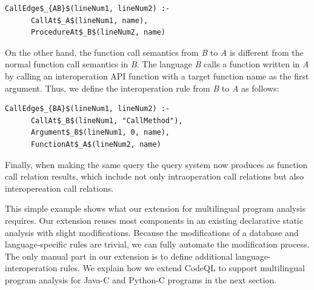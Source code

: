 
\begin{lstlisting}[style=mrule]
    CallEdge$_{AB}$(lineNum1, lineNum2) :-
      CallAt$_A$(lineNum1, name),
      ProcedureAt$_B$(lineNum2, name)
\end{lstlisting}

\noindent
On the other hand, the function call semantics from {\it B} to {\it A} is
different from the normal function call semantics in {\it B}. The language {\it B} calls
a function written in {\it A} by calling an interoperation API function  with a target function name as the first argument. Thus, we define
the interoperation rule from {\it B} to {\it A} as follows: 


\begin{lstlisting}[style=mrule]
    CallEdge$_{BA}$(lineNum1, lineNum2) :-
      CallAt$_B$(lineNum1, "CallMethod"),
      Argument$_B$(lineNum1, 0, name),
      FunctionAt$_A$(lineNum2, name)
\end{lstlisting}

%

Finally, when making the same query 
the query system
now produces   as function call relation results,
which include not only intraoperation call relations
but also interopereation call relations. 

This simple example shows what our extension for multilingual program analysis
requires. Our extension reuses most components in an existing declarative static
analysis with slight modifications. Because the modifications of a database and
language-specific rules are trivial, we can fully automate the modification
process.  The only manual part in our extension is to define additional
language-interoperation rules. We explain how we extend CodeQL to support
multilingual program analysis for Java-C and Python-C programs in the next section.

